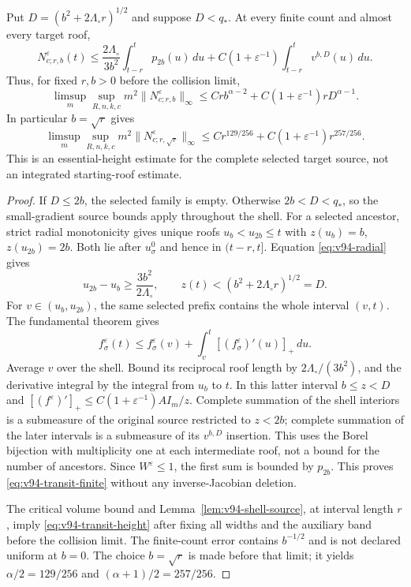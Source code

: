 \begin{theorem}
\label{thm:v94-transit}
Put $D=(b^2+2\Lambda_\circ r)^{1/2}$ and suppose $D<q_*$.
At every finite count and almost every target roof,
\begin{equation}\label{eq:v94-transit-finite}
 N_{c;r,b}^\varepsilon(t)
 \le\frac{2\Lambda_\circ}{3b^2}\int_{t-r}^t p_{2b}(u)\,du
       +C(1+\varepsilon^{-1})\int_{t-r}^t v^{b,D}(u)\,du.
\end{equation}
Thus, for fixed $r,b>0$ before the collision limit,
\begin{equation}\label{eq:v94-transit-height}
 \limsup_m\sup_{R,n,k,c}m^2\|N_{c;r,b}^\varepsilon\|_\infty
 \le C r b^{\alpha-2}
       +C(1+\varepsilon^{-1})rD^{\alpha-1}.
\end{equation}
In particular $b=\sqrt r$ gives
\begin{equation}\label{eq:v94-transit-power}
 \limsup_m\sup_{R,n,k,c}m^2\|N_{c;r,\sqrt r}^\varepsilon\|_\infty
 \le C r^{129/256}
             +C(1+\varepsilon^{-1})r^{257/256}.
\end{equation}
This is an essential-height estimate for the complete selected target
source, not an integrated starting-roof estimate.
\end{theorem}
\begin{proof}
If $D\le2b$, the selected family is empty. Otherwise $2b<D<q_*$,
so the small-gradient source bounds apply throughout the shell.
For a selected ancestor, strict radial monotonicity gives unique
roofs $u_b<u_{2b}\le t$ with $z(u_b)=b$, $z(u_{2b})=2b$.
Both lie after $u_\sigma^0$ and hence in $(t-r,t]$. Equation
\eqref{eq:v94-radial} gives
\[
 u_{2b}-u_b\ge\frac{3b^2}{2\Lambda_\circ},\qquad
                  z(t)<(b^2+2\Lambda_\circ r)^{1/2}=D.
\]
For $v\in(u_b,u_{2b})$, the same selected prefix contains the whole
interval $(v,t)$. The fundamental theorem gives
\[
 f_\sigma^\varepsilon(t)\le f_\sigma^\varepsilon(v)
                   +\int_v^t[(f_\sigma^\varepsilon)'(u)]_+\,du.
\]
Average $v$ over the shell. Bound its reciprocal roof length by
$2\Lambda_\circ/(3b^2)$, and the derivative integral by the integral
from $u_b$ to $t$. In this latter interval $b\le z<D$ and
$[(f^\varepsilon)' ]_+\le
 C(1+\varepsilon^{-1})A I_m/z$.
Complete summation of the shell interiors is a submeasure of the
original source restricted to $z<2b$; complete summation of the
later intervals is a submeasure of its $v^{b,D}$ insertion. This
uses the Borel bijection with multiplicity one at each intermediate
roof, not a bound for the number of ancestors. Since $W^\varepsilon\le1$,
the first sum is bounded by $p_{2b}$. This proves
\eqref{eq:v94-transit-finite} without any inverse-Jacobian deletion.

The critical volume bound and Lemma~\ref{lem:v94-shell-source}, at
interval length $r$, imply \eqref{eq:v94-transit-height} after fixing
all widths and the auxiliary band before the collision limit. The
finite-count error contains $b^{-1/2}$ and is not declared uniform
at $b=0$. The choice $b=\sqrt r$ is made before that limit; it yields
$\alpha/2=129/256$ and $(\alpha+1)/2=257/256$.
\end{proof}

